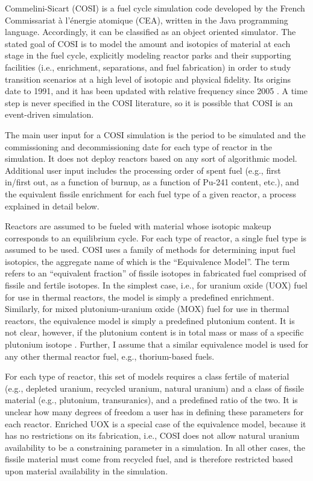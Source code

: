 Commelini-Sicart (COSI) is a fuel cycle simulation code developed by the French
Commissariat \`{a} l'\'{e}nergie atomique (CEA), written in the Java programming
language. Accordingly, it can be classified as an object oriented simulator. The
stated goal of COSI is to model the amount and isotopics of material at each
stage in the fuel cycle, explicitly modeling reactor parks and their supporting
facilities (i.e., enrichment, separations, and fuel fabrication) in order to
study transition scenarios at a high level of isotopic and physical
fidelity. Its origins date to 1991, and it has been updated with relative
frequency since 2005 \cite{boucher_cosi_2005,boucher_cosi:_2006,meyer_new_2009,
coquelet-pascal_validation_2011}. A time step is never specified in the COSI
literature, so it is possible that COSI is an event-driven simulation.

The main user input for a COSI simulation is the period to be simulated and the
commissioning and decommissioning date for each type of reactor in the
simulation. It does not deploy reactors based on any sort of algorithmic
model. Additional user input includes the processing order of spent fuel
(e.g., first in/first out, as a function of burnup, as a function of Pu-241
content, etc.), and the equivalent fissile enrichment for each fuel type of a
given reactor, a process explained in detail below.

Reactors are assumed to be fueled with material whose isotopic makeup
corresponds to an equilibrium cycle. For each type of reactor, a single fuel
type is assumed to be used. COSI uses a family of methods for determining input
fuel isotopics, the aggregate name of which is the ``Equivalence Model''. The
term refers to an ``equivalent fraction'' of fissile isotopes in fabricated fuel
comprised of fissile and fertile isotopes. In the simplest case, i.e., for
uranium oxide (UOX) fuel for use in thermal reactors, the model is simply a
predefined enrichment.  Similarly, for mixed plutonium-uranium oxide (MOX) fuel
for use in thermal reactors, the equivalence model is simply a predefined
plutonium content. It is not clear, however, if the plutonium content is in
total mass or mass of a specific plutonium isotope \cite{meyer_new_2009,
  coquelet-pascal_validation_2011}. Further, I assume that a similar equivalence
model is used for any other thermal reactor fuel, e.g., thorium-based fuels.

For each type of reactor, this set of models requires a class fertile of
material (e.g., depleted uranium, recycled uranium, natural uranium) and a class
of fissile material (e.g., plutonium, transuranics), and a predefined ratio of
the two. It is unclear how many degrees of freedom a user has in defining these
parameters for each reactor. Enriched UOX is a special case of the equivalence
model, because it has no restrictions on its fabrication, i.e., COSI does not
allow natural uranium availability to be a constraining parameter in a
simulation. In all other cases, the fissile material must come from recycled
fuel, and is therefore restricted based upon material availability in the
simulation.

